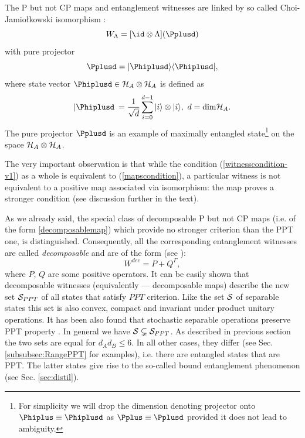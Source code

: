 \documentclass[twocolumn,aps,rmp]{revtex4}
\begin{document}
The P but not CP maps and entanglement witnesses are linked by so
called Choi-Jamio\l{}kowski isomorphism \cite{Jamiolkowski,Choi82}:
\begin{equation}
W_{\Lambda}=[\id \otimes \Lambda](\Pplusd) \label{isomorphism}
\end{equation}
with pure projector
\begin{equation}
\Pplusd=|\Phiplusd \rangle \langle \Phiplusd|,
\label{MaximallyEntangledProjector}
\end{equation}
where state vector $\Phiplusd\in {\cal H}_{A} \otimes {\cal
  H}_{A}$ is defined as
\begin{equation}
|\Phiplusd\>={1\over \sqrt{d}}\sum_{i=0}^{d-1} |i\rangle \otimes |i\rangle, \
d=\mathrm{dim} {\cal H}_{A}. \label{MaximallyEntangledVector}
\end{equation}
The pure projector $\Pplusd$ is an example of maximally entangled
state\footnote{For simplicity we will drop the dimension denoting
  projector onto $\Phiplus\equiv \Phiplusd$ as $\Pplus\equiv \Pplusd$
  provided it does not lead to ambiguity.} on the space ${\cal H}_{A}
\otimes {\cal H}_{A}$.

The very important observation is that while the condition
(\ref{witnesscondition-v1}) as a whole is equivalent to
(\ref{mapscondition}), a particular witness is not equivalent to a
positive map associated via isomorphism: the map proves a stronger
condition (see discussion further in the text).

As we already said, the special class of decomposable P but not CP
maps (i.e. of the form \ref{decomposablemap}) which provide no
stronger criterion than the PPT one, is distinguished. Consequently,
all the corresponding entanglement witnesses are called {\it
  decomposable} and are of the form (see \cite{Lewenstein00a}):
\begin{equation}
W^{dec}=P+Q^{\Gamma}, \label{DecomposableWitness}
\label{eq:dec_witness}
\end{equation}
where $P$, $Q$ are some positive operators. It can be easily shown
that decomposable witnesses (equivalently --- decomposable maps)
describe the new set ${\cal S}_{PPT}$ of all states that satisfy $PPT$
criterion. Like the set ${\cal S}$ of separable states this set is
also convex, compact and invariant under product unitary operations.
It has been also found that stochastic separable operations preserve
PPT property \cite{bound}. In general we have ${\cal S} \subsetneq
{\cal S}_{PPT}$. As described in previous section the two sets are
equal for $d_{A}d_{B} \leq 6$. In all other cases, they differ
\cite{Pawel97} (see Sec. \ref{subsubsec:RangePPT} for examples),
i.e. there are entangled states that are PPT. The latter states give
rise to the so-called bound entanglement phenomenon (see Sec.
\ref{sec:distil}).
\end{document}
